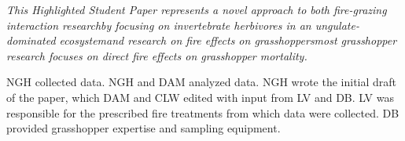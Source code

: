 \documentclass[referee, 
	            sn-basic]
           {sn-jnl}
\begin{document}
\begin{linenumbers}

\emph{This Highlighted Student Paper represents a novel approach to both fire-grazing interaction research\textemdash by focusing on invertebrate herbivores in an ungulate-dominated ecosystem\textemdash and research on fire effects on grasshoppers\textemdash most grasshopper research focuses on direct fire effects on grasshopper mortality.} 

NGH collected data. 
NGH and DAM analyzed data. 
NGH wrote the initial draft of the paper, which DAM and CLW edited with input from LV and DB.
LV was responsible for the prescribed fire treatments from which data were collected. 
DB provided grasshopper expertise and sampling equipment.



\end{linenumbers}
\end{document}
